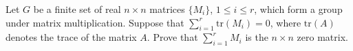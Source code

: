 Let $G$ be a finite set of real $n\times n$ matrices $\{M_i\}$, $1
\leq i \leq r$, which form a group under matrix
multiplication. Suppose that $\sum_{i=1}^r \mathrm{tr}(M_i)=0$, where
$\mathrm{tr}(A)$
denotes the trace of the matrix $A$. Prove that $\sum_{i=1}^r M_i$ is
the $n \times n$ zero matrix.
